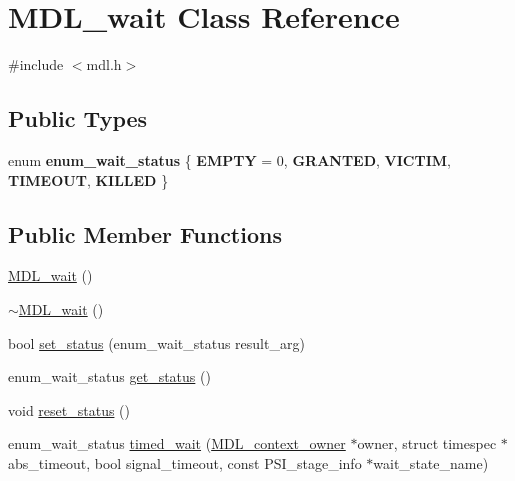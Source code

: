 \hypertarget{classMDL__wait}{}\section{M\+D\+L\+\_\+wait Class Reference}
\label{classMDL__wait}


{\ttfamily \#include $<$mdl.\+h$>$}

\subsection*{Public Types}
\begin{DoxyCompactItemize}
\item 
\mbox{\label{classMDL__wait_a737e84aa2586749f901d7880e7534a03}} 
enum {\bfseries enum\+\_\+wait\+\_\+status} \{ \newline
{\bfseries E\+M\+P\+TY} = 0, 
{\bfseries G\+R\+A\+N\+T\+ED}, 
{\bfseries V\+I\+C\+T\+IM}, 
{\bfseries T\+I\+M\+E\+O\+UT}, 
\newline
{\bfseries K\+I\+L\+L\+ED}
 \}
\end{DoxyCompactItemize}
\subsection*{Public Member Functions}
\begin{DoxyCompactItemize}
\item 
\mbox{\hyperlink{classMDL__wait_ac850dcbdaddab5440bdf2033256559a2}{M\+D\+L\+\_\+wait}} ()
\item 
\mbox{\hyperlink{classMDL__wait_ad75646f009b4c73a4616db585623b0f7}{$\sim$\+M\+D\+L\+\_\+wait}} ()
\item 
bool \mbox{\hyperlink{classMDL__wait_a5d2a1397b1b462b9a7308ba573add0a8}{set\+\_\+status}} (enum\+\_\+wait\+\_\+status result\+\_\+arg)
\item 
enum\+\_\+wait\+\_\+status \mbox{\hyperlink{classMDL__wait_af26291f41cc59cb379fb593f8af4bc2c}{get\+\_\+status}} ()
\item 
void \mbox{\hyperlink{classMDL__wait_ad31def1340b5e95c79479c53c1c2af84}{reset\+\_\+status}} ()
\item 
enum\+\_\+wait\+\_\+status \mbox{\hyperlink{classMDL__wait_ae5a547f550dbc3ef77d14f16e7cad58b}{timed\+\_\+wait}} (\mbox{\hyperlink{classMDL__context__owner}{M\+D\+L\+\_\+context\+\_\+owner}} $\ast$owner, struct timespec $\ast$abs\+\_\+timeout, bool signal\+\_\+timeout, const P\+S\+I\+\_\+stage\+\_\+info $\ast$wait\+\_\+state\+\_\+name)
\end{DoxyCompactItemize}


